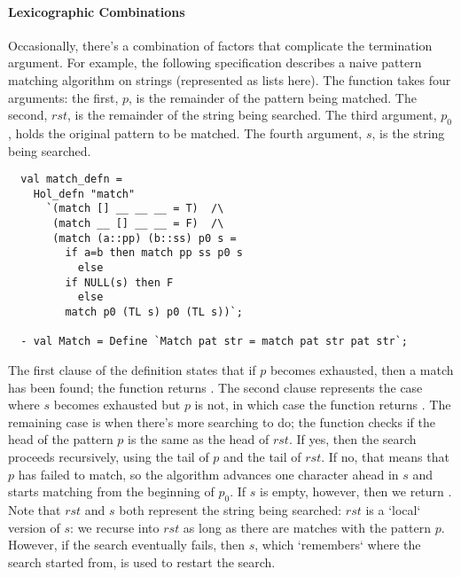 \paragraph{Lexicographic Combinations}

Occasionally, there's a combination of factors that complicate the
termination argument. For example, the following specification
describes a naive pattern matching algorithm on strings (represented
as lists here). The function takes four arguments: the first, $p$,
is the remainder of the pattern being matched. The second, 
$\mathit{rst}$, is the remainder of the string being searched.  The third 
argument, $p_0$, holds the original pattern to be matched. 
The fourth argument, $s$, is the string being searched. 
%
\setcounter{sessioncount}{0}
\begin{session}
\begin{hol}
\begin{verbatim}
  val match_defn =
    Hol_defn "match"
      `(match [] __ __ __ = T)  /\
       (match __ [] __ __ = F)  /\
       (match (a::pp) (b::ss) p0 s =
         if a=b then match pp ss p0 s
           else
         if NULL(s) then F
           else
         match p0 (TL s) p0 (TL s))`;

  - val Match = Define `Match pat str = match pat str pat str`;
\end{verbatim}
\end{hol}
\end{session}
%
The first clause of the definition states that if $p$ becomes exhausted, then a match has 
been found;  the function returns . The second clause represents the case
where $s$ becomes exhausted but $p$ is not, in which case the function returns 
\holtxt{F}. The remaining case is when there's more searching to do; the function
checks if the head of the pattern $p$ is the same as the head of 
$\mathit{rst}$. If yes, then the search proceeds recursively, using the
tail of $p$ and the tail of $\mathit{rst}$. If no, that means that $p$ has
failed to match, so the algorithm advances one character ahead in 
$\mathit{s}$ and starts matching from the beginning of $p_0$. If 
$\mathit{s}$ is empty, however, then we return \holtxt{F}. Note that 
$\mathit{rst}$ and $s$ both represent the string being
searched: $\mathit{rst}$ is a `local` version of $s$: we recurse into 
$\mathit{rst}$  as long as there are matches with the pattern $p$. However, 
if the search eventually fails, then $s$, which `remembers` where the search 
started from, is used to restart the search.

